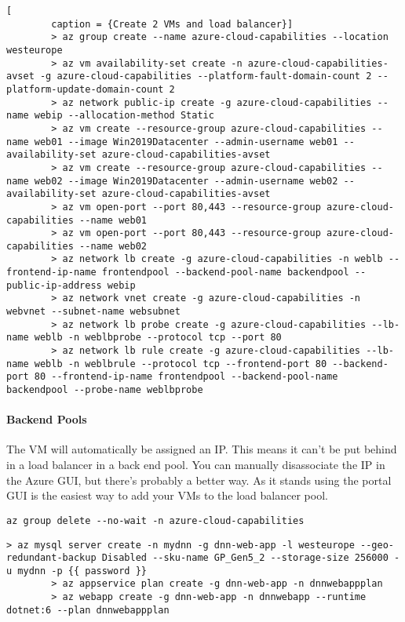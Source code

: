 \documentclass[a4paper,14pt]{report}
\begin{document}
    \begin{lstlisting}[
        caption = {Create 2 VMs and load balancer}]
        > az group create --name azure-cloud-capabilities --location westeurope
        > az vm availability-set create -n azure-cloud-capabilities-avset -g azure-cloud-capabilities --platform-fault-domain-count 2 --platform-update-domain-count 2
        > az network public-ip create -g azure-cloud-capabilities --name webip --allocation-method Static
        > az vm create --resource-group azure-cloud-capabilities --name web01 --image Win2019Datacenter --admin-username web01 --availability-set azure-cloud-capabilities-avset
        > az vm create --resource-group azure-cloud-capabilities --name web02 --image Win2019Datacenter --admin-username web02 --availability-set azure-cloud-capabilities-avset
        > az vm open-port --port 80,443 --resource-group azure-cloud-capabilities --name web01
        > az vm open-port --port 80,443 --resource-group azure-cloud-capabilities --name web02
        > az network lb create -g azure-cloud-capabilities -n weblb --frontend-ip-name frontendpool --backend-pool-name backendpool --public-ip-address webip
        > az network vnet create -g azure-cloud-capabilities -n webvnet --subnet-name websubnet
        > az network lb probe create -g azure-cloud-capabilities --lb-name weblb -n weblbprobe --protocol tcp --port 80
        > az network lb rule create -g azure-cloud-capabilities --lb-name weblb -n weblbrule --protocol tcp --frontend-port 80 --backend-port 80 --frontend-ip-name frontendpool --backend-pool-name backendpool --probe-name weblbprobe
    \end{lstlisting}

    \paragraph{Backend Pools} The VM will automatically be assigned an IP. This means it can't be put behind in a load balancer
    in a back end pool. You can manually disassociate the IP in the Azure GUI, but there's probably a better way. As it stands
    using the portal GUI is the easiest way to add your VMs to the load balancer pool.
    \begin{lstlisting}[caption={To Delete All Resources In The Group}]
    az group delete --no-wait -n azure-cloud-capabilities
    \end{lstlisting}

    \begin{lstlisting}[caption={DNN Web App}]
        > az mysql server create -n mydnn -g dnn-web-app -l westeurope --geo-redundant-backup Disabled --sku-name GP_Gen5_2 --storage-size 256000 -u mydnn -p {{ password }}
        > az appservice plan create -g dnn-web-app -n dnnwebappplan
        > az webapp create -g dnn-web-app -n dnnwebapp --runtime dotnet:6 --plan dnnwebappplan
    \end{lstlisting}
\end{document}
